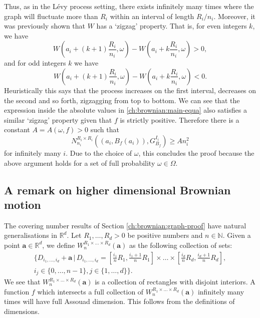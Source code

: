 	Thus, as in the L\'evy process setting, there exists infinitely many times where the graph will fluctuate more than $R_i$ within an interval of length $R_i/n_i$. Moreover, it was previously shown that $W$ has a `zigzag' property. That is, for even integers $k$, we have
	\[
	W\left(a_i+(k+1)\frac{R_i}{n_i},\omega\right)-W\left(a_i+k\frac{R_i}{n_i},\omega\right)>0,
	\] 
	and for odd integers $k$ we have
	\[
	W\left(a_i+(k+1)\frac{R_i}{n_i},\omega\right)-W\left(a_i+k\frac{R_i}{n_i},\omega\right)<0.
	\]  
	Heuristically this says that the process increases on the first interval, decreases on the second and so forth, zigzagging from top to bottom. We can see that the expression inside the absolute values in \eqref{ch:brownian:main-equa} also satisfies a similar `zigzag' property given that $f$ is strictly positive. Therefore there is a constant $A=A(\omega,f)>0$ such that
	\[
	N_{n_i}^{R_i\times R_i} \left( (a_i, B_f(a_i)), G_{B_f}^{I_i} \right) \ge  A n_i^2
	\] 
	for infinitely many $i$. Due to the choice of $\omega$, this concludes the proof because the above argument holds for a set of full probability $\omega\in\Omega$.





\subsection{A remark on higher dimensional Brownian motion}\label{ch-brownian:sec:higher-dim}

The covering number results of Section \ref{ch:brownian:graph-proof} have natural generalisations in $\mathbb{R}^d$. Let $R_1,\dots,R_d>0$ be positive numbers and $n\in \mathbb{N}$. Given a point $\mathbf{a}\in\mathbb{R}^d$, we define $W_{n}^{R_1\times\dots\times R_d}(\mathbf{a})$ as the following collection of sets:
\begin{eqnarray*}
	\Bigg\{D_{i_1,\dots,i_d}+\mathbf{a} \, \vert \, D_{i_1,\dots,i_d}=\left[\frac{i_1}{n}R_1,\frac{i_1+1}{n}R_1\right]\times\dots\times \left[\frac{i_d}{n}R_d,\frac{i_d+1}{n}R_d\right],\\ i_j\in\{0,\dots,n-1\}, j\in\{1,\dots,d\}\Bigg\}.
\end{eqnarray*}
We see that $W_{n}^{R_1\times\dots\times R_d}(\mathbf{a})$ is a collection of rectangles with disjoint interiors. A function $f$ which intersects a full collection of $W_{n}^{R_1\times\dots\times R_d}(\mathbf{a})$ infinitely many times will have full Assouad dimension. This follows from the definitions of dimensions.

